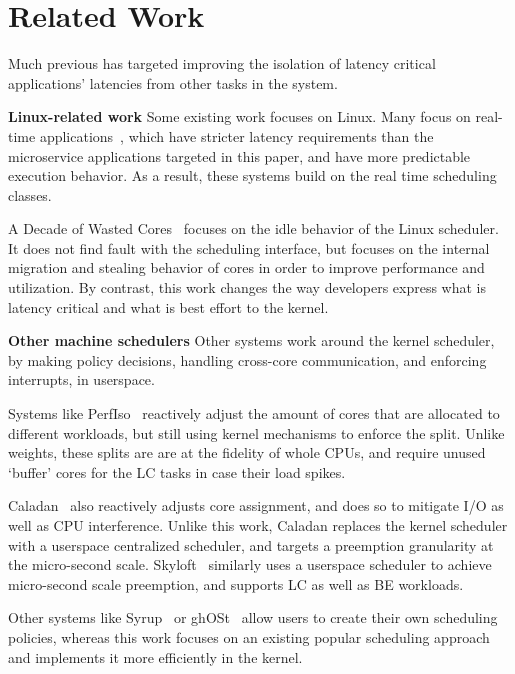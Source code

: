 \section{Related Work}

Much previous has targeted improving the isolation of latency critical
applications' latencies from other tasks in the system.

\textbf{Linux-related work} Some existing work focuses on Linux. Many focus on
real-time applications~\cite{rt-in-linux, state-rt-linux}, which have stricter
latency requirements than the microservice applications targeted in this paper,
and have more predictable execution behavior. As a result, these systems build
on the real time scheduling classes.

A Decade of Wasted Cores~\cite{wasted-cores} focuses on the idle behavior of the
Linux scheduler. It does not find fault with the scheduling interface, but
focuses on the internal migration and stealing behavior of cores in order to
improve performance and utilization. By contrast, this work changes the way
developers express what is latency critical and what is best effort to the
kernel.

\textbf{Other machine schedulers} Other systems work around the kernel
scheduler, by making policy decisions, handling cross-core communication, and
enforcing interrupts, in userspace.

Systems like PerfIso~\cite{perfiso} reactively adjust the amount of cores that
are allocated to different workloads, but still using kernel mechanisms to
enforce the split. Unlike \cgroups{} weights, these splits are are at the
fidelity of whole CPUs, and require unused `buffer' cores for the LC tasks in
case their load spikes.

Caladan~\cite{caladan} also reactively adjusts core assignment, and does so to
mitigate I/O as well as CPU interference. Unlike this work, Caladan replaces the
kernel scheduler with a userspace centralized scheduler, and targets a
preemption granularity at the micro-second scale. Skyloft~\cite{skyloft}
similarly uses a userspace scheduler to achieve micro-second scale preemption,
and supports LC as well as BE workloads.

Other systems like Syrup~\cite{syrup} or ghOSt~\cite{ghost} allow users to
create their own scheduling policies, whereas this work focuses on an existing
popular scheduling approach and implements it more efficiently in the kernel. 




